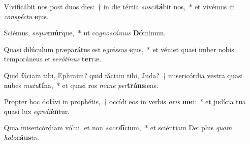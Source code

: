 \item Vivificábit nos post duos dies:~† in die tértia \textit{su}\textit{sci}\textbf{tá}bit nos,~* et vivémus in \textit{con}\textit{spéc}\textit{tu} \textbf{e}jus.
\item Sciémus, \textit{se}\textit{que}\textbf{múr}que,~* ut co\textit{gnos}\textit{cá}\textit{mus} \textbf{Dó}minum.
\item Quasi dilúculum præparátus est e\textit{grés}\textit{sus} \textbf{e}jus,~* et véniet quasi imber nobis temporáneus et se\textit{ró}\textit{ti}\textit{nus} \textbf{ter}ræ.
\item Quid fáciam tibi, Ephraim? quid fáciam tibi, Juda?~† misericórdia vestra quasi nubes \textit{ma}\textit{tu}\textbf{tí}na,~* et quasi ros \textit{ma}\textit{ne} \textit{per}\textbf{tráns}iens.
\item Propter hoc dolávi in prophétis,~† occídi eos in verbis \textit{o}\textit{ris} \textbf{me}i:~* et judícia tua quasi lux \textit{e}\textit{gre}\textit{di}\textbf{én}tur.
\item Quia misericórdiam vólui, et non \textit{sa}\textit{cri}\textbf{fí}cium,~* et sciéntiam Dei plus \textit{quam} \textit{ho}\textit{lo}\textbf{cáus}ta.
